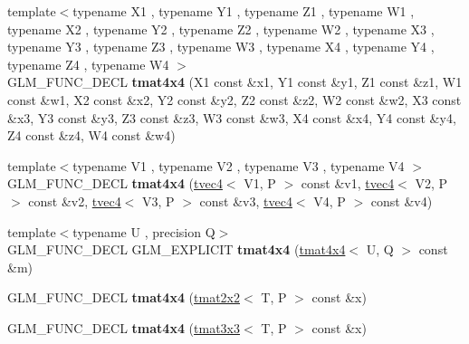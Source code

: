 \begin{DoxyCompactItemize}
\item 
\hypertarget{structglm_1_1tmat4x4_a21e75b577b5e9bf7a872de8820a383b8}{{\footnotesize template$<$typename X1 , typename Y1 , typename Z1 , typename W1 , typename X2 , typename Y2 , typename Z2 , typename W2 , typename X3 , typename Y3 , typename Z3 , typename W3 , typename X4 , typename Y4 , typename Z4 , typename W4 $>$ }\\G\-L\-M\-\_\-\-F\-U\-N\-C\-\_\-\-D\-E\-C\-L {\bfseries tmat4x4} (X1 const \&x1, Y1 const \&y1, Z1 const \&z1, W1 const \&w1, X2 const \&x2, Y2 const \&y2, Z2 const \&z2, W2 const \&w2, X3 const \&x3, Y3 const \&y3, Z3 const \&z3, W3 const \&w3, X4 const \&x4, Y4 const \&y4, Z4 const \&z4, W4 const \&w4)}\label{structglm_1_1tmat4x4_a21e75b577b5e9bf7a872de8820a383b8}

\item 
\hypertarget{structglm_1_1tmat4x4_a2e88247f4e213492fc372edce3c226a2}{{\footnotesize template$<$typename V1 , typename V2 , typename V3 , typename V4 $>$ }\\G\-L\-M\-\_\-\-F\-U\-N\-C\-\_\-\-D\-E\-C\-L {\bfseries tmat4x4} (\hyperlink{structglm_1_1tvec4}{tvec4}$<$ V1, P $>$ const \&v1, \hyperlink{structglm_1_1tvec4}{tvec4}$<$ V2, P $>$ const \&v2, \hyperlink{structglm_1_1tvec4}{tvec4}$<$ V3, P $>$ const \&v3, \hyperlink{structglm_1_1tvec4}{tvec4}$<$ V4, P $>$ const \&v4)}\label{structglm_1_1tmat4x4_a2e88247f4e213492fc372edce3c226a2}

\item 
\hypertarget{structglm_1_1tmat4x4_ab23da6e5a57ab5834de4be100480b406}{{\footnotesize template$<$typename U , precision Q$>$ }\\G\-L\-M\-\_\-\-F\-U\-N\-C\-\_\-\-D\-E\-C\-L G\-L\-M\-\_\-\-E\-X\-P\-L\-I\-C\-I\-T {\bfseries tmat4x4} (\hyperlink{structglm_1_1tmat4x4}{tmat4x4}$<$ U, Q $>$ const \&m)}\label{structglm_1_1tmat4x4_ab23da6e5a57ab5834de4be100480b406}

\item 
\hypertarget{structglm_1_1tmat4x4_ab8f61071f4bcaadf761d930e31ae2bbc}{G\-L\-M\-\_\-\-F\-U\-N\-C\-\_\-\-D\-E\-C\-L {\bfseries tmat4x4} (\hyperlink{structglm_1_1tmat2x2}{tmat2x2}$<$ T, P $>$ const \&x)}\label{structglm_1_1tmat4x4_ab8f61071f4bcaadf761d930e31ae2bbc}

\item 
\hypertarget{structglm_1_1tmat4x4_a067e574eda5790e829f471ef564b3580}{G\-L\-M\-\_\-\-F\-U\-N\-C\-\_\-\-D\-E\-C\-L {\bfseries tmat4x4} (\hyperlink{structglm_1_1tmat3x3}{tmat3x3}$<$ T, P $>$ const \&x)}\label{structglm_1_1tmat4x4_a067e574eda5790e829f471ef564b3580}


\end{DoxyCompactItemize}
